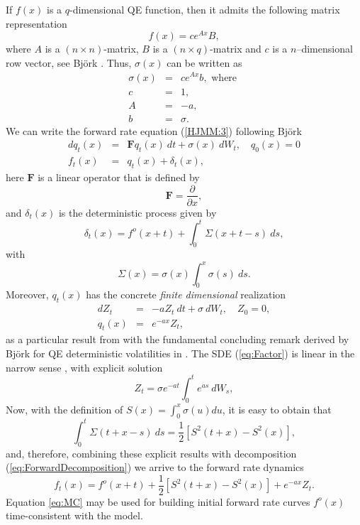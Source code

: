 If $f(x)$ is a $q$-dimensional QE function, then it admits the
following matrix representation  
\begin{equation}
\label{VolMatrixForm}
f(x)=c e^{A x} B,
\end{equation}
where $A$ is a $(n \times n)$-matrix, $B$ is a $(n\times q)$-matrix
and $c$ is a $n$--dimensional row vector, see Bj\"ork \cite[Lemma 2.1,
p. 13]{B:2003}. 
Thus, $\sigma(x)$ can be written as 
\begin{eqnarray}
\label{eq:TSVMatrix}
\sigma(x)& = & ce^{A x} b, \text{ where } \\
\nonumber 
c& =& 1,\\
\nonumber
 A& =& -a,\\
\nonumber
 b & = & \sigma.
\end{eqnarray}
We can write the forward rate equation (\ref{HJMM:3}) following
Bj\"ork \cite[Proposition 2.1, pp. 8--9]{B:2003}  
\begin{eqnarray}
\label{eq:Input}
dq_t(x) & = & \mathbf{F}q_t(x)\:dt+\sigma(x)\:dW_t,\quad q_0(x)=0\\
\label{eq:ForwardDecomposition}
f_t(x) & = & q_t(x)+\delta_t(x),
\end{eqnarray}
here $\mathbf{F}$ is a linear operator that is defined by 
$$
\mathbf{F}=\frac{\partial}{\partial x},
$$
and $\delta_t(x)$ is the deterministic process given by
$$
\delta_t(x)=f^o(x+t)+\int_0^t \Sigma(x+t-s)\: ds,
$$
with $$
\Sigma(x)=\sigma(x)\int_0^x \sigma(s)\: ds.
$$ 
Moreover, $q_t(x)$ has the concrete {\sl finite dimensional} realization 
\begin{eqnarray}
\label{eq:Factor}
dZ_t & = & -a Z_t\:dt+\sigma\:dW_t,\quad Z_0=0,\\
q_t(x) & = & e^{-a x}Z_t,
\end{eqnarray}
as a particular result from \cite[Definition 2.1, p. 7]{B:2001} with
the fundamental concluding remark derived by Bj\"ork for QE
deterministic volatilities in \cite[Proposition 2.3,
p. 13]{B:2001}. The SDE (\ref{eq:Factor}) is linear in the narrow
sense \cite{KP:1999}, with explicit solution
\begin{equation}
Z_t=\sigma e^{-a t}\int^t_0 e^{a s}\:dW_s,
\end{equation}
Now, with the definition of $S(x)=\int^x_0 \sigma(u) du$, it is easy to obtain that
$$
\int^t_0 \Sigma(t+x-s)\: ds=\frac{1}{2}\left[S^2(t+x)-S^2(x)\right],
$$
and, therefore, combining these explicit results with decomposition
(\ref{eq:ForwardDecomposition}) we arrive to the forward rate dynamics
\begin{equation}
\label{eq:MC}
f_t(x)=f^o(x+t)+\frac{1}{2}\left[S^2(t+x)-S^2(x)\right]+e^{-a x}Z_t.
\end{equation}
Equation \eqref{eq:MC} may be used for building initial forward rate
curves $f^o(x)$ time-consistent with the model.  

